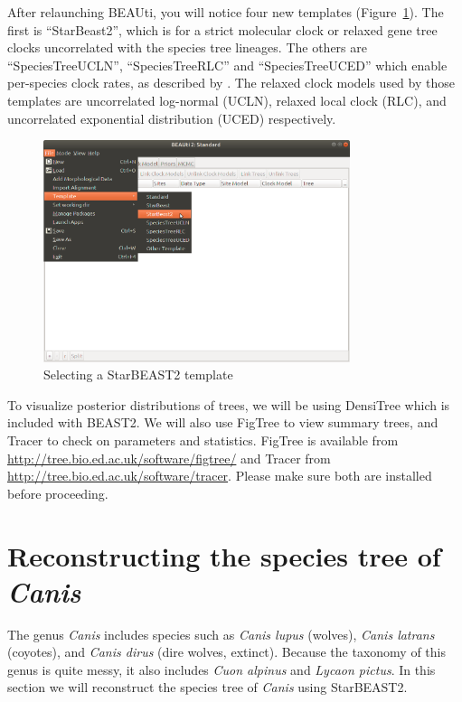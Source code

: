 \documentclass[12pt]{article}
\begin{document}
After relaunching BEAUti, you will notice four new templates (Figure~\ref{fig:strictClockTemplate}). The first
is ``StarBeast2'', which is for a strict molecular clock or relaxed
gene tree clocks uncorrelated with the species tree lineages. The others
are ``SpeciesTreeUCLN'', ``SpeciesTreeRLC'' and ``SpeciesTreeUCED'' which
enable per-species clock rates, as described by \cite{Ogilvie2016}.
The relaxed clock models used by those templates are uncorrelated log-normal (UCLN),
relaxed local clock (RLC), and uncorrelated exponential distribution (UCED)
respectively.

\begin{figure}[htb!]
\centering
\includegraphics[width=0.8\textwidth]{figures/strictClockTemplate.png}
\caption
{Selecting a StarBEAST2 template}
\label{fig:strictClockTemplate}
\end{figure}

To visualize posterior distributions of trees, we will be using DensiTree
\citep{Bouckaert2010} which is included with BEAST2. We will also use
FigTree to view summary trees, and Tracer to check on parameters and
statistics. FigTree is available from \url{http://tree.bio.ed.ac.uk/software/figtree/}
and Tracer from \url{http://tree.bio.ed.ac.uk/software/tracer}. Please make sure both are
installed before proceeding.

\clearpage

\section{Reconstructing the species tree of \textit{Canis}}
\label{sec:speciesTree}

The genus \textit{Canis} includes species such as \textit{Canis lupus} (wolves),
\textit{Canis latrans} (coyotes), and \textit{Canis dirus} (dire wolves, extinct).
Because the
taxonomy of this genus is quite messy, it also includes
\textit{Cuon alpinus} and \textit{Lycaon pictus}.
In this section we will reconstruct the species tree of \textit{Canis} using StarBEAST2.
\end{document}

